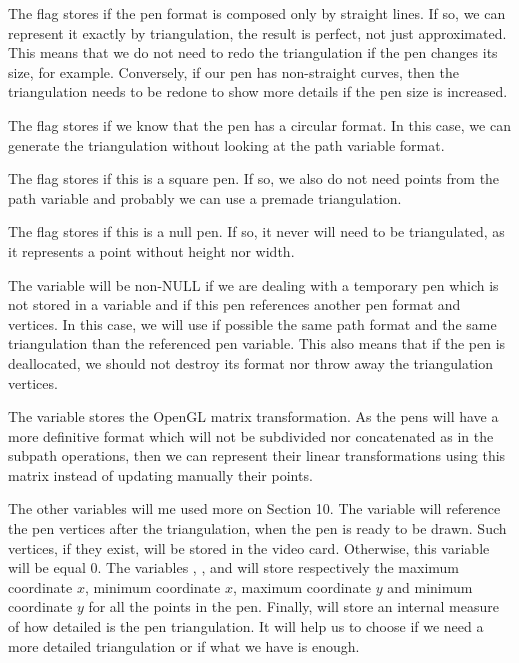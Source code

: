 The flag  stores if the pen format is
composed only by straight lines. If so, we can represent it exactly by
triangulation, the result is perfect, not just approximated. This
means that we do not need to redo the triangulation if the pen changes
its size, for example. Conversely, if our pen has non-straight curves,
then the triangulation needs to be redone to show more details if the
pen size is increased. 

The flag  stores if we know that the pen has
a circular format. In this case, we can generate the triangulation
without looking at the path variable format.

The flag  stores if this is a square pen. If
so, we also do not need points from the path variable and probably we
can use a premade triangulation.

The flag  stores if this is a null pen. If so,
it never will need to be triangulated, as it represents a point
without height nor width.

The variable  will be non-NULL if we are
dealing with a temporary pen which is not stored in a variable and if
this pen references another pen format and vertices. In this case, we
will use if possible the same path format and the same triangulation
than the referenced pen variable. This also means that if the pen is
deallocated, we should not destroy its format nor throw away the
triangulation vertices.

The variable  stores the OpenGL matrix
transformation. As the pens will have a more definitive format which
will not be subdivided nor concatenated as in the subpath operations,
then we can represent their linear transformations using this matrix
instead of updating manually their points.

The other variables will me used more on Section 10. The
variable  will reference the pen vertices after
the triangulation, when the pen is ready to be drawn. Such vertices,
if they exist, will be stored in the video card. Otherwise, this
variable will be equal 0. The
variables , , 
and
 will store respectively the maximum coordinate $x$,
minimum coordinate $x$, maximum coordinate $y$ and minimum coordinate
$y$ for all the points in the
pen. Finally,  will store an internal
measure of how detailed is the pen triangulation. It will help us to
choose if we need a more detailed triangulation or if what we have is
enough.

